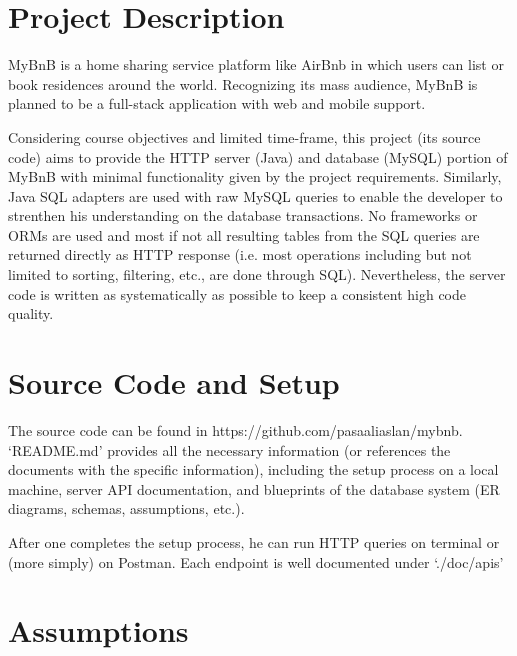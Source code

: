 \documentclass[11pt]{article}
\begin{document}
\pagestyle{fancy}
\fancyhead{}
\fancyfoot{}
\fancyfoot[R]{\thepage}

\section*{Project Description}

MyBnB is a home sharing service platform like AirBnb in which users can list or book
residences around the world. Recognizing its mass audience, MyBnB is planned to be
a full-stack application with web and mobile support.

Considering course objectives and limited time-frame, this project (its source code)
aims to provide the HTTP server (Java) and database (MySQL) portion of MyBnB with minimal functionality given by the
project requirements. Similarly, Java SQL adapters are used with raw MySQL queries
to enable the developer to strenthen his understanding on the database transactions. No frameworks or ORMs are used and
most if not all resulting tables from the SQL queries are returned directly as HTTP response (i.e.
most operations including but not limited to sorting, filtering, etc., are done through SQL).
Nevertheless, the server code is written as systematically as possible to keep a consistent high code
quality.


\section*{Source Code and Setup}

The source code can be found in https://github.com/pasaaliaslan/mybnb. `README.md' provides all the necessary
information (or references the documents with the specific information), including the setup
process on a local machine, server API documentation, and blueprints of the database system
(ER diagrams, schemas, assumptions, etc.).

After one completes the setup process, he can run HTTP queries on terminal or (more simply)
on Postman. Each endpoint is well documented under `./doc/apis'

\section*{Assumptions}
\end{document}

